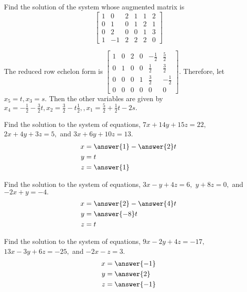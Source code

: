 \documentclass{ximera}
\begin{document}
\begin{problem}\label{prb:2.29} Find the solution of the system whose augmented matrix is
\begin{equation*}
\left[
\begin{array}{rrrrr|r}
1 & 0 & 2 & 1 & 1 & 2 \\
0 & 1 & 0 & 1 & 2 & 1 \\
0 & 2 & 0 & 0 & 1 & 3 \\
1 & -1 & 2 & 2 & 2 & 0
\end{array}
\right]
\end{equation*}
\begin{hint}
The reduced row echelon form is $\left[
\begin{array}{rrrrr|r}
1 & 0 & 2 & 0 & - \frac{1}{2} &  \frac{5}{2} \\
0 & 1 & 0 & 0 &  \frac{1}{2} &  \frac{3}{2} \\
0 & 0 & 0 & 1 &  \frac{3}{2} & - \frac{1}{2} \\
0 & 0 & 0 & 0 & 0 & 0
\end{array}
\right] $. Therefore, let $x_{5}=t,x_{3}=s.$ Then the other variables are
given by $x_{4}=-\frac{1}{2}-\frac{3}{2}t,x_{2}=\frac{3}{2}-t\frac{1}{2}
,,x_{1}=\frac{5}{2}+\frac{1}{2}t-2s.$
\end{hint}
\end{problem}

\begin{problem}\label{prb:2.30} Find the solution to the system of equations, $7x+14y+15z=22,
$ $2x+4y+3z=5,$ and $3x+6y+10z=13.$
 \begin{align*}
 x&=\answer{1}-\answer{2}t\\
 y&=t\\
 z&=\answer{1}\\
 \end{align*}
\end{problem}

\begin{problem}\label{prb:2.31} Find the solution to the system of equations, $3x-y+4z=6,$
$y+8z=0,$ and $-2x+y=-4.$
 \begin{align*}
 x&=\answer{2}-\answer{4}t\\
 y&=\answer{-8}t\\
 z&=t\\
 \end{align*}
\end{problem}

\begin{problem}\label{prb:2.32} Find the solution to the system of equations, $9x-2y+4z=-17,
$ $13x-3y+6z=-25,$ and $-2x-z=3.$
 \begin{align*}
 x&=\answer{-1}\\
 y&=\answer{2}\\
 z&=\answer{-1}\\
 \end{align*}
\end{problem}
\end{document}
